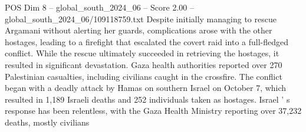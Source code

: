 \begin{textsample}{POS Dim 8 – global\_south\_2024\_06 – Score 2.00 – global\_south\_2024\_06/109118759.txt}
Despite initially managing to rescue Argamani without alerting her guards, complications arose with the other hostages, leading to a firefight that escalated the covert raid into a full-fledged conflict.
While the rescue ultimately succeeded in retrieving the hostages, it resulted in significant devastation.
Gaza health authorities reported over 270 Palestinian casualties, including civilians caught in the crossfire.
The conflict began with a deadly attack by Hamas on southern Israel on October 7, which resulted in 1,189 Israeli deaths and 252 individuals taken as hostages.
Israel ' s response has been relentless, with the Gaza Health Ministry reporting over 37,232 deaths, mostly civilians

\end{textsample}
